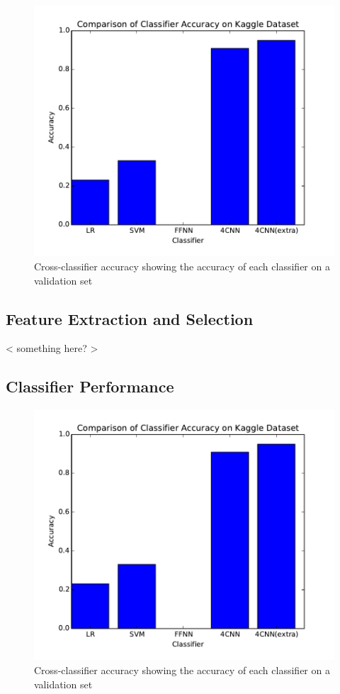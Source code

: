 \documentclass[conference]{IEEEtran}
\begin{document}
\begin{figure}[h]
	
	\centering
	\includegraphics[scale=0.6]{cross-classifier-acc.pdf}
	\caption{Cross-classifier accuracy showing the accuracy of each classifier on a validation set}
	\label{crossacc}
\end{figure}



\subsection{Feature Extraction and Selection}
< something here? >


\subsection{Classifier Performance}

\begin{figure}[h]
	
	\centering
	\includegraphics[scale=0.6]{cross-classifier-acc.pdf}
	\caption{Cross-classifier accuracy showing the accuracy of each classifier on a validation set}
	\label{crossacc}
\end{figure}
\end{document}
